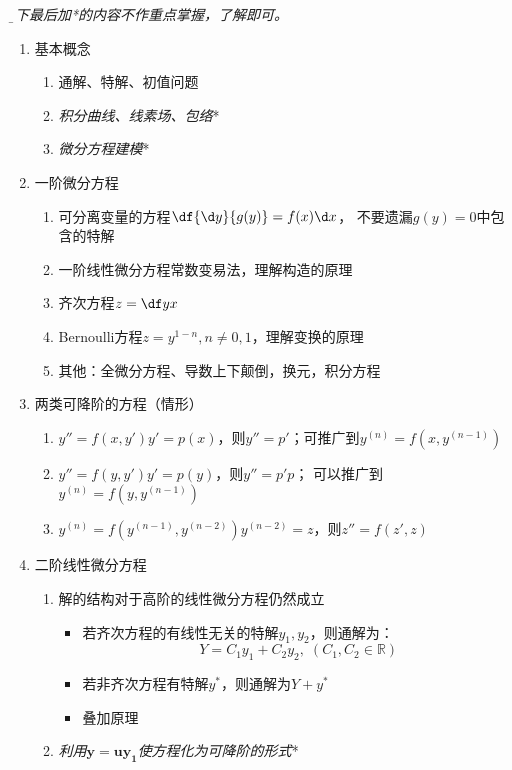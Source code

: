 {\it\b 以下最后加*的内容不作重点掌握，了解即可。}

\begin{enumerate}[1.]
  \item 基本概念
  \begin{enumerate}[(1)]
    \item 通解、特解、初值问题
    \item {\it 积分曲线、线素场、包络}*
    \item {\it 微分方程建模}*
  \end{enumerate}
  \item 一阶微分方程
  \begin{enumerate}[(1)]
    \item 可分离变量的方程\dotfill$\df{\d y}{g(y)}=f(x)\d x$，
    不要遗漏$g(y)=0$中包含的特解
    \item 一阶线性微分方程\dotfill 常数变易法，理解构造的原理
    \item 齐次方程\dotfill$z=\df yx$
    \item Bernoulli方程\dotfill$z=y^{1-n},n\ne0,1$，理解变换的原理
    \item 其他：全微分方程、导数上下颠倒，换元，积分方程
  \end{enumerate}
  \item 两类可降阶的方程（情形）
  \begin{enumerate}[(1)]
    \item $y''=f(x,y')$$y'=p(x)$，则$y''=p'$；可推广到$y^{(n)}=f(x,y^{(n-1)})$
    \item $y''=f(y,y')$\dotfill$y'=p(y)$，则$y''=p'p$；
    可以推广到$y^{(n)}=f(y,y^{(n-1)})$
    \item $y^{(n)}=f(y^{(n-1)},y^{(n-2)})$\dotfill$y^{(n-2)}=z$，则$z''=f(z',z)$
  \end{enumerate}
  \item 二阶线性微分方程
  \begin{enumerate}[(1)]
    \item 解的结构\dotfill 对于高阶的线性微分方程仍然成立
    \begin{itemize}
      \item 若齐次方程的有线性无关的特解$y_1,y_2$，则通解为：
      $$Y=C_1y_1+C_2y_2,\;(C_1,C_2\in\mathbb{R})$$
      \item 若非齐次方程有特解$y^*$，则通解为$Y+y^*$
      \item 叠加原理
    \end{itemize}
    \item {\it 利用$\bm{y=uy_1}$使方程化为可降阶的形式}*

\end{enumerate}
\end{enumerate}
